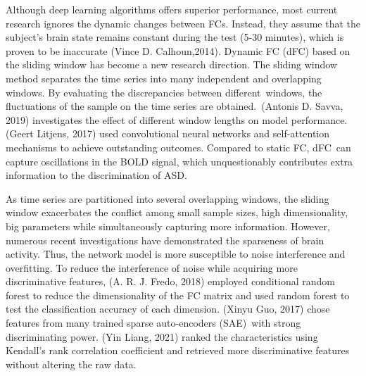 \documentclass[a4paper]{cas-dc}
\begin{document}
Although deep learning algorithms offers superior performance, most current research ignores the dynamic changes between FCs. Instead, they assume that the subject's brain state remains constant during the test (5-30 minutes), which is proven to be inaccurate (Vince D. Calhoun,2014). Dynamic FC (dFC) based on the sliding window has become a new research direction. The sliding window method separates the time series into many independent and overlapping windows. By evaluating the discrepancies between different windows, the fluctuations of the sample on the time series are obtained. (Antonis D. Savva, 2019) investigates the effect of different window lengths on model performance. (Geert Litjens, 2017) used convolutional neural networks and self-attention mechanisms to achieve outstanding outcomes. Compared to static FC, dFC can capture oscillations in the BOLD signal, which unquestionably contributes extra information to the discrimination of ASD.


As time series are partitioned into several overlapping windows, the sliding window exacerbates the conflict among small sample sizes, high dimensionality, big parameters while simultaneously capturing more information. However, numerous recent investigations have demonstrated the sparseness of brain activity. Thus, the network model is more susceptible to noise interference and overfitting. To reduce the interference of noise while acquiring more discriminative features, (A. R. J. Fredo, 2018) employed conditional random forest to reduce the dimensionality of the FC matrix and used random forest to test the classification accuracy of each dimension. (Xinyu Guo, 2017) chose features from many trained sparse auto-encoders (SAE) with strong discriminating power. (Yin Liang, 2021) ranked the characteristics using Kendall's rank correlation coefficient and retrieved more discriminative features without altering the raw data.
\end{document}
